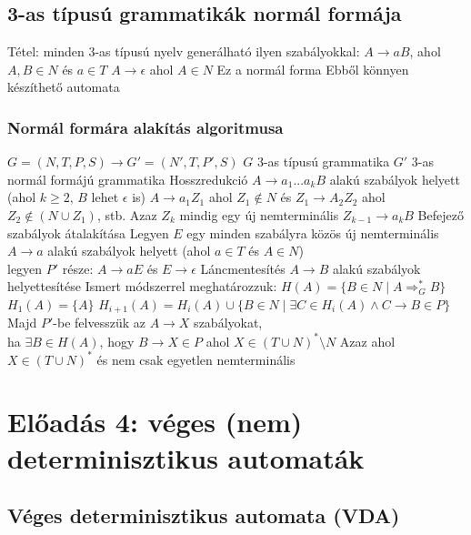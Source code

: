 \documentclass[12pt,a4paper]{article}
\newcommand{\gtos}{\Rightarrow_G^*}
\begin{document}
\subsection{3-as típusú grammatikák normál formája}

\begin{outline}
	\1 Tétel: minden $3$-as típusú nyelv generálható ilyen szabályokkal:
		\2 $A \to aB$, ahol $A,B \in N$ és $a \in T$
		\2 $A \to \epsilon$ ahol $A \in N$
	\1 Ez a normál forma
	\1 Ebből könnyen készíthető automata
\end{outline}

\pagebreak

\subsubsection{Normál formára alakítás algoritmusa}

\begin{outline}
	\1 $G=(N,T,P,S) \to G'=(N',T,P',S)$
		\2 $G$ 3-as típusú grammatika
		\2 $G'$ 3-as normál formájú grammatika
	\1 Hosszredukció
		\2 $A \to a_1...a_kB$ alakú szabályok helyett (ahol $k \ge 2$, $B$ lehet $\epsilon$ is)
		\2 $A \to a_1Z_1$ ahol $Z_1 \notin N$ és $Z_1 \to A_2Z_2$ ahol $Z_2 \notin (N \cup Z_1)$, stb.
		\2 Azaz $Z_k$ mindig egy új nemterminális
		\2 $Z_{k-1} \to a_kB$
	\1 Befejező szabályok átalakítása
		\2 Legyen $E$ egy minden szabályra közös új nemterminális
		\2 $A \to a$ alakú szabályok helyett (ahol $a \in T$ és $A \in N$)\\
		legyen $P'$ része: $A \to aE$ és $E \to \epsilon$
	\1 Láncmentesítés
		\2 $A \to B$ alakú szabályok helyettesítése
		\2 Ismert módszerrel meghatározzuk: $H(A) = \{B \in N \;|\; A \gtos B \}$
			\3 $H_1(A) = \{A\}$
			\3 $H_{i+1}(A)=H_i(A) \cup \{B \in N \;|\; \exists C \in H_i(A) \wedge C \to B \in P\}$
		\2 Majd $P'$-be felvesszük az $A \to X$ szabályokat,\\
		ha $\exists B \in H(A)$, hogy $B \to X \in P$ ahol $X \in (T \cup N)^* \setminus N$
			\3 Azaz ahol $X \in (T \cup N)^*$ és nem csak egyetlen nemterminális
\end{outline}

\pagebreak

\section{Előadás 4: véges (nem) determinisztikus automaták}

\subsection{Véges determinisztikus automata (VDA)}
\end{document}

